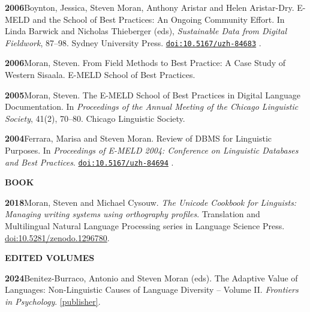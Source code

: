 \documentclass[11pt]{article}
\newcommand{\hangpara}{
 \setlength{\parindent}{0in} %
 \hangindent=0.42in %
}
\newcommand{\doi}[1]{%
  \href{https://doi.org/#1}{\nolinkurl{doi:#1}}%
}
\begin{document}
\vskip 6pt
\hangpara
{\bf 2006}\hspace{1ex}Boynton, Jessica, Steven Moran, Anthony Aristar and Helen Aristar-Dry. E-MELD and the School of Best Practices: An Ongoing Community Effort. In Linda Barwick and Nicholas Thieberger (eds), {\it Sustainable Data from Digital Fieldwork}, 87--98. Sydney University Press. \doi{10.5167/uzh-84683}.

\vskip 6pt
\hangpara
{\bf 2006}\hspace{1ex}Moran, Steven. From Field Methods to Best Practice: A Case Study of Western Sisaala. E-MELD School of Best Practices.

\vskip 6pt
\hangpara
{\bf 2005}\hspace{1ex}Moran, Steven. The E-MELD School of Best Practices in Digital Language Documentation. In {\it Proceedings of the Annual Meeting of the Chicago Linguistic Society}, 41(2), 70--80. Chicago Linguistic Society.


\vskip 6pt
\hangpara
{\bf 2004}\hspace{1ex}Ferrara, Marisa and Steven Moran. Review of DBMS for Linguistic Purposes. In {\it Proceedings of E-MELD 2004: Conference on Linguistic Databases and Best Practices}. \doi{10.5167/uzh-84694}.

\vskip 20pt
\begin{flushleft}
{\bf BOOK}
\end{flushleft}

\hangpara
{\bf 2018}\hspace{1ex}Moran, Steven and Michael Cysouw. {\it The Unicode Cookbook for Linguists: Managing writing systems using orthography profiles}. Translation and Multilingual Natural Language Processing series in Language Science Press. \href{https://doi.org/10.5281/zenodo.1296780}{doi:10.5281/zenodo.1296780}. %

\vskip 20pt
\begin{flushleft}
{\bf EDITED VOLUMES}
\end{flushleft}

\hangpara
{\bf 2024}\hspace{1ex}Benitez-Burraco, Antonio and Steven Moran (eds). The Adaptive Value of Languages: Non-Linguistic Causes of Language Diversity -- Volume II. {\it Frontiers in Psychology}. \href{https://www.frontiersin.org/research-topics/40686/the-adaptive-value-of-languages-non-linguistic-causes-of-language-diversity---volume-ii#articles}{[publisher]}. %
\end{document}
